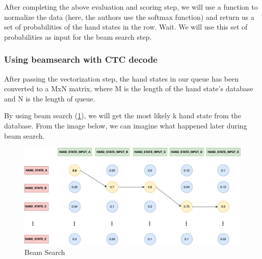       
After completing the above evaluation and scoring step, we will use a function to normalize the data (here, the authors use the softmax function) and return us a set of probabilities of the hand states in the row. Wait. We will use this set of probabilities as input for the beam search step.

\subsubsection{ Using beamsearch with CTC decode }

After passing the vectorization step, the hand states in our queue has been converted to a MxN matrix, where M is the length of the hand state's database and N is the length of queue.

By using beam search (\ref{fig:Chap4-BeamSearch}), we will get the most likely k hand state from the database. From the image below, we can imagine what happened later during beam search.

      


\begin{figure}[H]
  \centering
  \includegraphics[width=\textwidth]{img/Chap4/BeamSearch.png}
  \caption{ Beam Search }
  \label{fig:Chap4-BeamSearch}
\end{figure}

